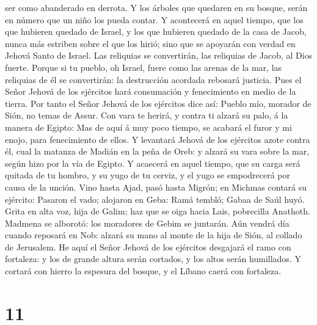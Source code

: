 ser como abanderado en derrota.  Y los árboles que quedaren
en su bosque, serán en número que un niño los pueda contar.
 Y acontecerá en aquel tiempo, que los que hubieren quedado
de Israel, y los que hubieren quedado de la casa de Jacob, nunca más
estriben sobre el que los hirió; sino que se apoyarán con verdad en
Jehová Santo de Israel.  Las reliquias se convertirán, las
reliquias de Jacob, al Dios fuerte.  Porque si tu pueblo,
oh Israel, fuere como las arenas de la mar, las reliquias de él se
convertirán: la destrucción acordada rebosará justicia. 
Pues el Señor Jehová de los ejércitos hará consumación y fenecimiento en
medio de la tierra.  Por tanto el Señor Jehová de los
ejércitos dice así: Pueblo mío, morador de Sión, no temas de Assur. Con
vara te herirá, y contra ti alzará su palo, á la manera de Egipto:
 Mas de aquí á muy poco tiempo, se acabará el furor y mi
enojo, para fenecimiento de ellos.  Y levantará Jehová de
los ejércitos azote contra él, cual la matanza de Madián en la peña de
Oreb: y alzará su vara sobre la mar, según hizo por la vía de Egipto.
 Y acaecerá en aquel tiempo, que su carga será quitada de
tu hombro, y su yugo de tu cerviz, y el yugo se empodrecerá por causa de
la unción.  Vino hasta Ajad, pasó hasta Migrón; en Michmas
contará su ejército:  Pasaron el vado; alojaron en Geba:
Ramá tembló; Gabaa de Saúl huyó.  Grita en alta voz, hija
de Galim; haz que se oiga hacia Lais, pobrecilla Anathoth. 
Madmena se alborotó: los moradores de Gebim se juntarán. 
Aún vendrá día cuando reposará en Nob: alzará su mano al monte de la
hija de Sión, al collado de Jerusalem.  He aquí el Señor
Jehová de los ejércitos desgajará el ramo con fortaleza: y los de grande
altura serán cortados, y los altos serán humillados.  Y
cortará con hierro la espesura del bosque, y el Líbano caerá con
fortaleza.

\hypertarget{section-10}{%
\section{11}\label{section-10}}


